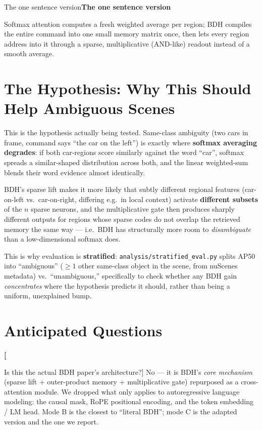 \documentclass[11pt]{article}
\newlength{\boxinnerwidth}
\newenvironment{keybox}[1][]{%
  \def\tmptitle{#1}%
  \setlength{\boxinnerwidth}{\dimexpr\linewidth-2\fboxsep-2\fboxrule\relax}%
  \begin{lrbox}{\keyboxbin}
  \begin{minipage}{\boxinnerwidth}
  \ifx\tmptitle\empty\else\noindent\textbf{\tmptitle}\par\smallskip\fi
}{%
  \end{minipage}
  \end{lrbox}%
  \par\addvspace{8pt}\noindent\fcolorbox{blue!35!black}{blue!4}{\usebox{\keyboxbin}}\par\addvspace{8pt}%
}
\newenvironment{qabox}[1]{%
  \setlength{\boxinnerwidth}{\dimexpr\linewidth-2\fboxsep-2\fboxrule\relax}%
  \begin{lrbox}{\qaboxbin}
  \begin{minipage}{\boxinnerwidth}
  \noindent\textbf{#1}\par\smallskip
}{%
  \end{minipage}
  \end{lrbox}%
  \par\addvspace{8pt}\noindent\fcolorbox{orange!60!black}{yellow!6}{\usebox{\qaboxbin}}\par\addvspace{8pt}%
}
\begin{document}
\begin{keybox}[The one sentence version]
Softmax attention computes a fresh weighted average per region; BDH compiles the
entire command into one small memory matrix once, then lets every region address
into it through a sparse, multiplicative (AND-like) readout instead of a smooth
average.
\end{keybox}

\section{The Hypothesis: Why This Should Help Ambiguous Scenes}

This is the hypothesis actually being tested. Same-class ambiguity (two cars in
frame, command says ``the car on the left'') is exactly where \textbf{softmax
averaging degrades}: if both car-regions score similarly against the word
``car'', softmax spreads a similar-shaped distribution across both, and the linear
weighted-sum blends their word evidence almost identically.

BDH's sparse lift makes it more likely that subtly different regional features
(car-on-left vs.\ car-on-right, differing e.g.\ in local context) activate
\textbf{different subsets} of the $n$ sparse neurons, and the multiplicative gate
then produces sharply different outputs for regions whose sparse codes do not
overlap the retrieved memory the same way --- i.e.\ BDH has structurally more room
to \emph{disambiguate} than a low-dimensional softmax does.

This is why evaluation is \textbf{stratified}: \texttt{analysis/stratified\_eval.py}
splits AP50 into ``ambiguous'' ($\geq 1$ other same-class object in the scene, from
nuScenes metadata) vs.\ ``unambiguous,'' specifically to check whether any BDH gain
\emph{concentrates} where the hypothesis predicts it should, rather than being a
uniform, unexplained bump.

\section{Anticipated Questions}

\begin{qabox}[Is this the actual BDH paper's architecture?]
No --- it is BDH's \emph{core mechanism} (sparse lift + outer-product memory +
multiplicative gate) repurposed as a cross-attention module. We dropped what only
applies to autoregressive language modeling: the causal mask, RoPE positional
encoding, and the token embedding / LM head. Mode B is the closest to ``literal
BDH''; mode C is the adapted version and the one we report.
\end{qabox}
\end{document}

